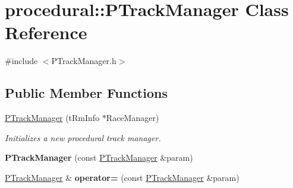 \hypertarget{classprocedural_1_1_p_track_manager}{\section{procedural\-:\-:P\-Track\-Manager Class Reference}
\label{classprocedural_1_1_p_track_manager}
}


{\ttfamily \#include $<$P\-Track\-Manager.\-h$>$}

\subsection*{Public Member Functions}
\begin{DoxyCompactItemize}
\item 
\hyperlink{classprocedural_1_1_p_track_manager_acda1ee549cb04c8780c85646ce56aa21}{P\-Track\-Manager} (t\-Rm\-Info $\ast$Race\-Manager)
\begin{DoxyCompactList}\small\item\em Initializes a new procedural track manager. \end{DoxyCompactList}\item 
\hypertarget{classprocedural_1_1_p_track_manager_a93188ed3f651ec15d422a2b2233fff08}{{\bfseries P\-Track\-Manager} (const \hyperlink{classprocedural_1_1_p_track_manager}{P\-Track\-Manager} \&param)}\label{classprocedural_1_1_p_track_manager_a93188ed3f651ec15d422a2b2233fff08}

\item 
\hypertarget{classprocedural_1_1_p_track_manager_a5f3d1bfe2089c91227f55f70ed374801}{\hyperlink{classprocedural_1_1_p_track_manager}{P\-Track\-Manager} \& {\bfseries operator=} (const \hyperlink{classprocedural_1_1_p_track_manager}{P\-Track\-Manager} \&param)}\label{classprocedural_1_1_p_track_manager_a5f3d1bfe2089c91227f55f70ed374801}


\end{DoxyCompactItemize}
